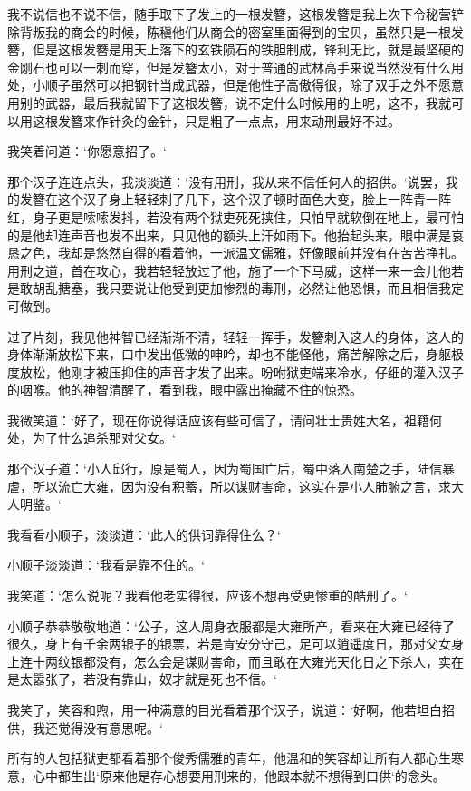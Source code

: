 我不说信也不说不信，随手取下了发上的一根发簪，这根发簪是我上次下令秘营铲除背叛我的商会的时候，陈稹他们从商会的密室里面得到的宝贝，虽然只是一根发簪，但是这根发簪是用天上落下的玄铁陨石的铁胆制成，锋利无比，就是最坚硬的金刚石也可以一刺而穿，但是发簪太小，对于普通的武林高手来说当然没有什么用处，小顺子虽然可以把钢针当成武器，但是他性子高傲得很，除了双手之外不愿意用别的武器，最后我就留下了这根发簪，说不定什么时候用的上呢，这不，我就可以用这根发簪来作针灸的金针，只是粗了一点点，用来动刑最好不过。

我笑着问道：‘你愿意招了。‘

那个汉子连连点头，我淡淡道：‘没有用刑，我从来不信任何人的招供。‘说罢，我的发簪在这个汉子身上轻轻刺了几下，这个汉子顿时面色大变，脸上一阵青一阵红，身子更是嗦嗦发抖，若没有两个狱吏死死挟住，只怕早就软倒在地上，最可怕的是他却连声音也发不出来，只见他的额头上汗如雨下。他抬起头来，眼中满是哀恳之色，我却是悠然自得的看着他，一派温文儒雅，好像眼前并没有在苦苦挣扎。用刑之道，首在攻心，我若轻轻放过了他，施了一个下马威，这样一来一会儿他若是敢胡乱搪塞，我只要说让他受到更加惨烈的毒刑，必然让他恐惧，而且相信我定可做到。

过了片刻，我见他神智已经渐渐不清，轻轻一挥手，发簪刺入这人的身体，这人的身体渐渐放松下来，口中发出低微的呻吟，却也不能怪他，痛苦解除之后，身躯极度放松，他刚才被压抑住的声音才发了出来。吩咐狱吏端来冷水，仔细的灌入汉子的咽喉。他的神智清醒了，看到我，眼中露出掩藏不住的惊恐。

我微笑道：‘好了，现在你说得话应该有些可信了，请问壮士贵姓大名，祖籍何处，为了什么追杀那对父女。‘

那个汉子道：‘小人邱行，原是蜀人，因为蜀国亡后，蜀中落入南楚之手，陆信暴虐，所以流亡大雍，因为没有积蓄，所以谋财害命，这实在是小人肺腑之言，求大人明鉴。‘

我看看小顺子，淡淡道：‘此人的供词靠得住么？‘

小顺子淡淡道：‘我看是靠不住的。‘

我笑道：‘怎么说呢？我看他老实得很，应该不想再受更惨重的酷刑了。‘

小顺子恭恭敬敬地道：‘公子，这人周身衣服都是大雍所产，看来在大雍已经待了很久，身上有千余两银子的银票，若是肯安分守己，足可以逍遥度日，那对父女身上连十两纹银都没有，怎么会是谋财害命，而且敢在大雍光天化日之下杀人，实在是太嚣张了，若没有靠山，奴才就是死也不信。‘

我笑了，笑容和煦，用一种满意的目光看着那个汉子，说道：‘好啊，他若坦白招供，我还觉得没有意思呢。‘

所有的人包括狱吏都看着那个俊秀儒雅的青年，他温和的笑容却让所有人都心生寒意，心中都生出‘原来他是存心想要用刑来的，他跟本就不想得到口供‘的念头。

